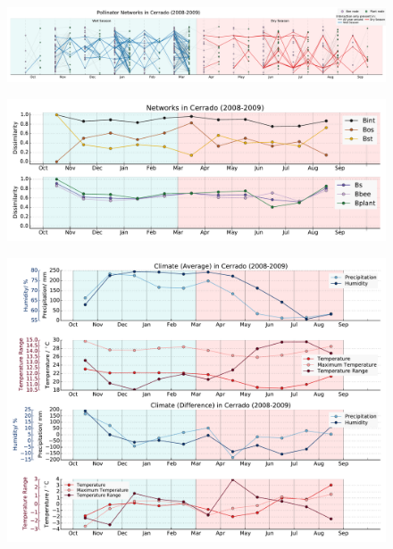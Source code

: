 \documentclass[11pt]{article}
\begin{document}
\begin{landscape}
\begin{figure}[H]
  \centering
    \includegraphics[width=255mm]{seasonalnetwork(new).pdf}
\end{figure}

\begin{figure}[H]
  \centering
    \includegraphics[width=250mm]{TurnoversAcrossTime(new).pdf}
\end{figure}

\begin{figure}[H]
  \centering
    \includegraphics[width=250mm]{ClimateAcrossTime(new).pdf}
\end{figure}
\end{landscape}

\newpage


\end{document}
